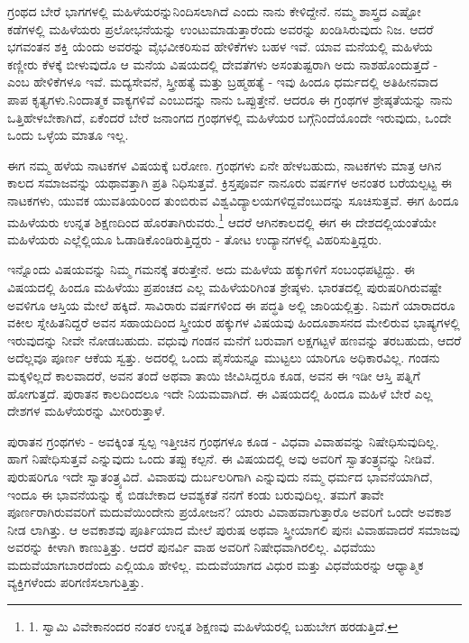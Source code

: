 ಗ್ರಂಥದ ಬೇರೆ ಭಾಗಗಳಲ್ಲಿ ಮಹಿಳೆಯರನ್ನುನಿಂದಿಸಲಾಗಿದೆ ಎಂದು ನಾನು ಕೇಳಿದ್ದೇನೆ. ನಮ್ಮ ಶಾಸ್ತ್ರದ ಎಷ್ಟೋ ಕಡೆಗಳಲ್ಲಿ ಮಹಿಳೆಯರು ಪ್ರಲೋಭನೆಯನ್ನು ಉಂಟುಮಾಡುತ್ತಾರೆಂದು ಅವರನ್ನು ಖಂಡಿಸಿರುವುದು ನಿಜ. ಆದರೆ ಭಗವಂತನ ಶಕ್ತಿ ಯೆಂದು ಅವರನ್ನು ವೈಭವೀಕರಿಸುವ ಹೇಳಿಕೆಗಳು ಬಹಳ ಇವೆ. ಯಾವ ಮನೆಯಲ್ಲಿ ಮಹಿಳೆಯ ಕಣ್ಣೀರು ಕೆಳಕ್ಕೆ ಬೀಳುವುದೊ ಆ ಮನೆಯ ವಿಷಯದಲ್ಲಿ ದೇವತೆಗಳು ಅಸಂತುಷ್ಟರಾಗಿ ಅದು ನಾಶಹೊಂದುತ್ತದೆ - ಎಂಬ ಹೇಳಿಕೆಗಳೂ ಇವೆ. ಮದ್ಯಸೇವನೆ, ಸ್ತ್ರೀಹತ್ಯೆ ಮತ್ತು ಬ್ರಹ್ಮಹತ್ಯೆ - ಇವು ಹಿಂದೂ ಧರ್ಮದಲ್ಲಿ ಅತಿಹೀನವಾದ ಪಾಪ ಕೃತ್ಯಗಳು.ನಿಂದಾತ್ಮಕ ವಾಕ್ಯಗಳಿವೆ ಎಂಬುದನ್ನು ನಾನು ಒಪ್ಪುತ್ತೇನೆ. ಆದರೂ ಈ ಗ್ರಂಥಗಳ ಶ್ರೇಷ್ಠತೆಯನ್ನು ನಾನು ಒತ್ತಿಹೇಳಬೇಕಾಗಿದೆ, ಏಕೆಂದರೆ ಬೇರೆ ಜನಾಂಗದ ಗ್ರಂಥಗಳಲ್ಲಿ ಮಹಿಳೆಯರ ಬಗ್ಗೆನಿಂದೆಯೊಂದೇ ಇರುವುದು, ಒಂದೇ ಒಂದು ಒಳ್ಳೆಯ ಮಾತೂ ಇಲ್ಲ.

ಈಗ ನಮ್ಮ ಹಳೆಯ ನಾಟಕಗಳ ವಿಷಯಕ್ಕೆ ಬರೋಣ. ಗ್ರಂಥಗಳು ಏನೇ ಹೇಳಬಹುದು, ನಾಟಕಗಳು ಮಾತ್ರ ಆಗಿನ ಕಾಲದ ಸಮಾಜವನ್ನು ಯಥಾವತ್ತಾಗಿ ಪ್ರತಿ ನಿಧಿಸುತ್ತವೆ. ಕ್ರಿಸ್ತಪೂರ್ವ ನಾನೂರು ವರ್ಷಗಳ ಅನಂತರ ಬರೆಯಲ್ಪಟ್ಟ ಈ ನಾಟಕಗಳು, ಯುವಕ ಯುವತಿಯರಿಂದ ತುಂಬಿರುವ ವಿಶ್ವವಿದ್ಯಾಲಯಗಳಿದ್ದವೆಂಬುದನ್ನು ಸೂಚಿಸುತ್ತವೆ. ಈಗ ಹಿಂದೂ ಮಹಿಳೆಯರು ಉನ್ನತ ಶಿಕ್ಷಣದಿಂದ ಹೊರತಾಗಿರುವರು.\footnote{1. ಸ್ವಾಮಿ ವಿವೇಕಾನಂದರ ನಂತರ ಉನ್ನತ ಶಿಕ್ಷಣವು ಮಹಿಳೆಯರಲ್ಲಿ ಬಹುಬೇಗ ಹರಡುತ್ತಿದೆ.} ಆದರೆ ಆಗಿನಕಾಲದಲ್ಲಿ ಈಗ ಈ ದೇಶದಲ್ಲಿಯಂತೆಯೇ ಮಹಿಳೆಯರು ಎಲ್ಲೆಲ್ಲಿಯೂ ಓಡಾಡಿಕೊಂಡಿರುತ್ತಿದ್ದರು - ತೋಟ ಉದ್ಯಾನಗಳಲ್ಲಿ ವಿಹರಿಸುತ್ತಿದ್ದರು.

ಇನ್ನೊಂದು ವಿಷಯವನ್ನು ನಿಮ್ಮ ಗಮನಕ್ಕೆ ತರುತ್ತೇನೆ. ಅದು ಮಹಿಳೆಯ ಹಕ್ಕುಗಳಿಗೆ ಸಂಬಂಧಪಟ್ಟಿದ್ದು. ಈ ವಿಷಯದಲ್ಲಿ ಹಿಂದೂ ಮಹಿಳೆಯು ಪ್ರಪಂಚದ ಎಲ್ಲ ಮಹಿಳೆಯರಿಗಿಂತ ಶ್ರೇಷ್ಠಳು. ಭಾರತದಲ್ಲಿ ಪುರುಷರಿಗಿರುವಷ್ಟೇ ಅವಳಿಗೂ ಆಸ್ತಿಯ ಮೇಲೆ ಹಕ್ಕಿದೆ. ಸಾವಿರಾರು ವರ್ಷಗಳಿಂದ ಈ ಪದ್ಧತಿ ಅಲ್ಲಿ ಜಾರಿಯಲ್ಲಿತ್ತು. ನಿಮಗೆ ಯಾರಾದರೂ ವಕೀಲ ಸ್ನೇಹಿತನಿದ್ದರೆ ಅವನ ಸಹಾಯದಿಂದ ಸ್ತ್ರೀಯರ ಹಕ್ಕುಗಳ ವಿಷಯವು ಹಿಂದೂಶಾಸನದ ಮೇಲಿರುವ ಭಾಷ್ಯಗಳಲ್ಲಿ ಇರುವುದನ್ನು ನೀವೇ ನೋಡಬಹುದು. ವಧುವು ಗಂಡನ ಮನೆಗೆ ಬರುವಾಗ ಲಕ್ಷಗಟ್ಟಳೆ ಹಣವನ್ನು ತರಬಹುದು, ಆದರೆ ಅದೆಲ್ಲವೂ ಪೂರ್ಣ ಆಕೆಯ ಸ್ವತ್ತು. ಅದರಲ್ಲಿ ಒಂದು ಪೈಸೆಯನ್ನೂ ಮುಟ್ಟಲು ಯಾರಿಗೂ ಅಧಿಕಾರವಿಲ್ಲ. ಗಂಡನು ಮಕ್ಕಳಿಲ್ಲದೆ ಕಾಲವಾದರೆ, ಅವನ ತಂದೆ ಅಥವಾ ತಾಯಿ ಜೀವಿಸಿದ್ದರೂ ಕೂಡ, ಅವನ ಈ ಇಡೀ ಆಸ್ತಿ ಪತ್ನಿಗೆ ಹೋಗುತ್ತದೆ. ಪುರಾತನ ಕಾಲದಿಂದಲೂ ಇದೇ ನಿಯಮವಾಗಿದೆ. ಈ ವಿಷಯದಲ್ಲಿ ಹಿಂದೂ ಮಹಿಳೆ ಬೇರೆ ಎಲ್ಲ ದೇಶಗಳ ಮಹಿಳೆಯರನ್ನು ಮೀರಿರುತ್ತಾಳೆ.

ಪುರಾತನ ಗ್ರಂಥಗಳು - ಅವಕ್ಕಿಂತ ಸ್ವಲ್ಪ ಇತ್ತೀಚಿನ ಗ್ರಂಥಗಳೂ ಕೂಡ - ವಿಧವಾ ವಿವಾಹವನ್ನು ನಿಷೇಧಿಸುವುದಿಲ್ಲ. ಹಾಗೆ ನಿಷೇಧಿಸುತ್ತವೆ ಎನ್ನುವುದು ಒಂದು ತಪ್ಪು ಕಲ್ಪನೆ. ಈ ವಿಷಯದಲ್ಲಿ ಅವು ಅವರಿಗೆ ಸ್ವಾತಂತ್ರ್ಯವನ್ನು ನೀಡಿವೆ. ಪುರುಷರಿಗೂ ಇದೇ ಸ್ವಾತಂತ್ರ್ಯವಿದೆ. ವಿವಾಹವು ದುರ್ಬಲರಿಗಾಗಿ ಎನ್ನುವುದು ನಮ್ಮ ಧರ್ಮದ ಭಾವನೆಯಾಗಿದೆ, ಇಂದೂ ಈ ಭಾವನೆಯನ್ನು ಕೈ ಬಿಡಬೇಕಾದ ಆವಶ್ಯಕತೆ ನನಗೆ ಕಂಡು ಬರುವುದಿಲ್ಲ. ತಮಗೆ ತಾವೇ ಪೂರ್ಣರಾಗಿರುವವರಿಗೆ ಮದುವೆಯಿಂದೇನು ಪ್ರಯೋಜನ? ಯಾರು ವಿವಾಹವಾಗುತ್ತಾರೊ ಅವರಿಗೆ ಒಂದೇ ಅವಕಾಶ ನೀಡ ಲಾಗಿತ್ತು. ಆ ಅವಕಾಶವು ಪೂರ್ತಿಯಾದ ಮೇಲೆ ಪುರುಷ ಅಥವಾ ಸ್ತ್ರೀಯಾಗಲಿ ಪುನಃ ವಿವಾಹವಾದರೆ ಸಮಾಜವು ಅವರನ್ನು ಕೀಳಾಗಿ ಕಾಣುತ್ತಿತ್ತು. ಆದರೆ ಪುನರ್ವಿ ವಾಹ ಅವರಿಗೆ ನಿಷೇಧವಾಗಿರಲಿಲ್ಲ. ವಿಧವೆಯು ಮದುವೆಯಾಗಬಾರದೆಂದು ಎಲ್ಲಿಯೂ ಹೇಳಿಲ್ಲ. ಮದುವೆಯಾಗದ ವಿಧುರ ಮತ್ತು ವಿಧವೆಯರನ್ನು ಆಧ್ಯಾತ್ಮಿಕ ವ್ಯಕ್ತಿಗಳೆಂದು ಪರಿಗಣಿಸಲಾಗುತ್ತಿತ್ತು.

